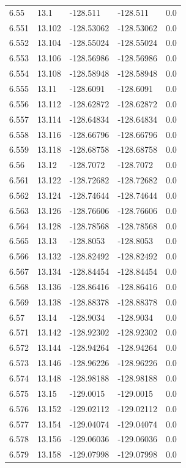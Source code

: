 \begin{tabular}{lllll}
6.55 & 13.1 & -128.511 & -128.511 & 0.0 \\
6.551 & 13.102 & -128.53062 & -128.53062 & 0.0 \\
6.552 & 13.104 & -128.55024 & -128.55024 & 0.0 \\
6.553 & 13.106 & -128.56986 & -128.56986 & 0.0 \\
6.554 & 13.108 & -128.58948 & -128.58948 & 0.0 \\
6.555 & 13.11 & -128.6091 & -128.6091 & 0.0 \\
6.556 & 13.112 & -128.62872 & -128.62872 & 0.0 \\
6.557 & 13.114 & -128.64834 & -128.64834 & 0.0 \\
6.558 & 13.116 & -128.66796 & -128.66796 & 0.0 \\
6.559 & 13.118 & -128.68758 & -128.68758 & 0.0 \\
6.56 & 13.12 & -128.7072 & -128.7072 & 0.0 \\
6.561 & 13.122 & -128.72682 & -128.72682 & 0.0 \\
6.562 & 13.124 & -128.74644 & -128.74644 & 0.0 \\
6.563 & 13.126 & -128.76606 & -128.76606 & 0.0 \\
6.564 & 13.128 & -128.78568 & -128.78568 & 0.0 \\
6.565 & 13.13 & -128.8053 & -128.8053 & 0.0 \\
6.566 & 13.132 & -128.82492 & -128.82492 & 0.0 \\
6.567 & 13.134 & -128.84454 & -128.84454 & 0.0 \\
6.568 & 13.136 & -128.86416 & -128.86416 & 0.0 \\
6.569 & 13.138 & -128.88378 & -128.88378 & 0.0 \\
6.57 & 13.14 & -128.9034 & -128.9034 & 0.0 \\
6.571 & 13.142 & -128.92302 & -128.92302 & 0.0 \\
6.572 & 13.144 & -128.94264 & -128.94264 & 0.0 \\
6.573 & 13.146 & -128.96226 & -128.96226 & 0.0 \\
6.574 & 13.148 & -128.98188 & -128.98188 & 0.0 \\
6.575 & 13.15 & -129.0015 & -129.0015 & 0.0 \\
6.576 & 13.152 & -129.02112 & -129.02112 & 0.0 \\
6.577 & 13.154 & -129.04074 & -129.04074 & 0.0 \\
6.578 & 13.156 & -129.06036 & -129.06036 & 0.0 \\
6.579 & 13.158 & -129.07998 & -129.07998 & 0.0 \\

\end{tabular}

